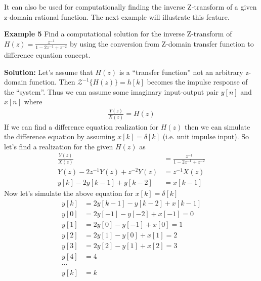 \documentclass[twoside]{article}
\begin{document}
It can also be used for computationally finding the
inverse Z-transform of a given z-domain rational function. 
The next example will illustrate this feature. 

\textbf{Example 5} Find a computational solution for the inverse Z-transform of $H(z) =
\frac{z^{-1}}{1 - 2 z^{-1} + z^{-2}}$ by using the conversion from
Z-domain transfer function to difference equation concept. 

\textbf{Solution:} Let's assume that $H(z)$ is a ``transfer function''
not an arbitrary z-domain function. Then $\mathcal{Z}^{-1} \lbrace
H(z) \rbrace = h[k]$ becomes the impulse response of the ``system''. 
Thus we can assume some imaginary input-output pair $y[n]$ and
$x[n]$ where 
%
\begin{align*}
  \frac{Y(z)}{X(z)} = H(z) 
\end{align*}
%
If we can find a difference equation realization for $H(z)$
then we can simulate the difference equation by assuming
$x[k] = \delta[k]$ (i.e. unit impulse input). So let's find a
realization for the given $H(z)$ as
%
\begin{align*}
  \frac{Y(z)}{X(z)} &= \frac{z^{-1}}{1 - 2 z^{-1} + z^{-2}}
\\
Y(z) - 2 z^{-1} Y(z) + z^{-2} Y(z) &= z^{-1} X(z)
\\
y[k] - 2 y[k-1] + y[k-2] &= x[k-1]
\end{align*}
%
Now let's simulate the above equation for $x[k] = \delta[k]$
%
\begin{align*}
y[k] &= 2 y[k-1] - y[k-2]  + x[k-1]
\\
y[0] &= 2 y[-1] - y[-2]  + x[-1] = 0
\\
y[1] &= 2 y[0] - y[-1]  + x[0] = 1
\\
y[2] &= 2 y[1] - y[0]  + x[1] = 2
\\
y[3] &= 2 y[2] - y[1]  + x[2] = 3
\\
y[4] &= 4
\\
\cdots 
\\
y[k] &= k
\end{align*}
%




\end{document}
